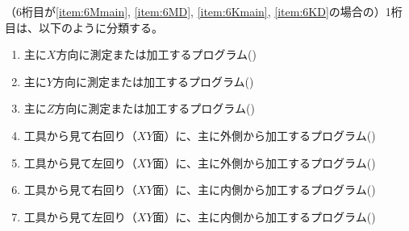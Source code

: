 \clearpage
（6桁目が\ref{item:6Mmain}, \ref{item:6MD}, \ref{item:6Kmain}, \ref{item:6KD}\hx の場合の）1桁目は、以下のように分類する。
\begin{enumerate}[label=\arabic*.]
\item 主に$X$方向に測定または加工するプログラム({})
\item 主に$Y$方向に測定または加工するプログラム({})
\item 主に$Z$方向に測定または加工するプログラム({})
\item 工具から見て右回り（$XY$面）に、主に外側から加工するプログラム({})
\item 工具から見て左回り（$XY$面）に、主に外側から加工するプログラム({})
\item 工具から見て右回り（$XY$面）に、主に内側から加工するプログラム({})
\item 工具から見て左回り（$XY$面）に、主に内側から加工するプログラム({})
\end{enumerate}
